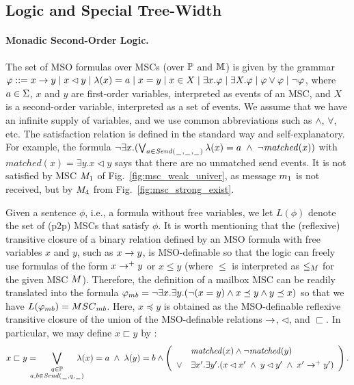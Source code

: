 \documentclass[a4paper,UKenglish,cleveref, autoref, thm-restate]{lipics-v2021}
\begin{document}
\subsection{Logic and Special Tree-Width}

\paragraph*{Monadic Second-Order Logic.}
The set of MSO formulas over MSCs (over $\mathbb{P}$ and $\mathbb{M}$) is given by the grammar
$
\varphi ::= x \to y \mid x \lhd y \mid \lambda(x) = a \mid x = y \mid x \in X \mid \exists x.\varphi \mid \exists X.\varphi \mid \varphi \vee \varphi \mid \neg \varphi
$,
where $a \in \Sigma$, $x$ and $y$ are first-order variables, interpreted as
events of an MSC, and $X$ is a second-order variable, interpreted
as a set of events. We assume that we have an infinite supply of variables,
and we use common abbreviations such as $\wedge$, $\forall$, etc.
The satisfaction relation is defined in the standard way and self-explanatory.
For example, the formula $\neg\exists x.(\bigvee_{a \in {\mathit{Send}(\hspace{0.1em}\underline{\hspace{0.5em}}\hspace{0.1em},\hspace{0.1em}\underline{\hspace{0.5em}}\hspace{0.1em},\hspace{0.1em}\underline{\hspace{0.5em}}\hspace{0.1em})}} \lambda(x) = a \;\wedge\; \neg \mathit{matched}(x))$
with $\mathit{matched}(x) = \exists y.x \lhd y$
says that there are no unmatched send events.
It is not satisfied by  MSC $M_{1}$
of Fig.~\ref{fig:msc_weak_univer},
as message $m_1$ is not received,
but by $M_{4}$ from Fig.~\ref{fig:msc_strong_exist}.

Given a sentence $\phi$, i.e., a formula without free variables,
we let $L(\phi)$ denote the set of (p2p) MSCs that satisfy $\phi$.
%
It is worth mentioning that the (reflexive) transitive closure of
a binary relation defined by an MSO formula with free variables $x$ and $y$,
such as $x \to y$, is MSO-definable so that the logic can freely
use formulas of the form $x \to^+ y$ or $x \le y$ (where $\le$
is interpreted as $\le_M$ for the given MSC $M$).
Therefore, the definition of a mailbox MSC can be readily translated into
the formula $\mbformula = \neg \exists x.\exists y.(\neg (x = y) \wedge x \preceq y \wedge y \preceq x)$ so that we have $L(\mbformula) = \mbMSCs$.
Here, $x \preceq y$ is obtained as the MSO-definable reflexive transitive closure of
the union of the MSO-definable relations $\to$, $\lhd$, and $\sqsubset$.
In particular, we may define $x \sqsubset y$ by :
\[
x \sqsubset y =
\displaystyle
\hspace{-1em}\bigvee_{\substack{q \in \mathbb{P}\\a,b \in {\mathit{Send}(\hspace{0.1em}\underline{\hspace{0.5em}}\hspace{0.1em},q,\hspace{0.1em}\underline{\hspace{0.5em}}\hspace{0.1em})}}}\hspace{-1em}
\lambda(x) = a \;\wedge\; \lambda(y) = b
\wedge
\left(
\begin{array}{rl}
& \mathit{matched}(x) \wedge \neg \mathit{matched}(y)\\[1ex]
\vee & \exists x'.\exists y'. (x \lhd x' \;\wedge\; y \lhd y' \;\wedge\; x' \to^+ y')
\end{array}
\right).
\]
\end{document}
